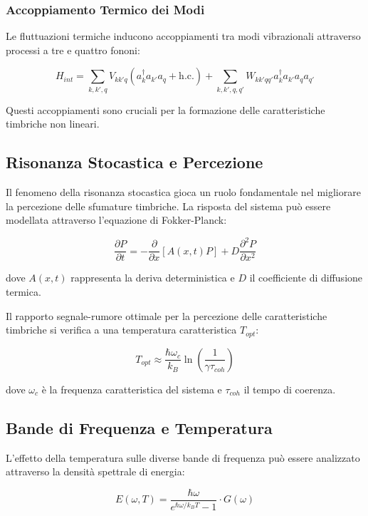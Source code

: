 \documentclass[a4paper,11pt]{article}
\begin{document}
\subsubsection{Accoppiamento Termico dei
Modi}\label{accoppiamento-termico-dei-modi}

Le fluttuazioni termiche inducono accoppiamenti tra modi vibrazionali
attraverso processi a tre e quattro fononi:

\[H_{int} = \sum_{k,k',q} V_{kk'q}(a_k^\dagger a_{k'} a_q + \text{h.c.}) +
    \sum_{k,k',q,q'} W_{kk'qq'}a_k^\dagger a_{k'} a_q a_{q'}\]

Questi accoppiamenti sono cruciali per la formazione delle
caratteristiche timbriche non lineari.

\subsection{Risonanza Stocastica e
Percezione}\label{risonanza-stocastica-e-percezione}

Il fenomeno della risonanza stocastica gioca un ruolo fondamentale nel
migliorare la percezione delle sfumature timbriche. La risposta del
sistema può essere modellata attraverso l'equazione di Fokker-Planck:

\[\frac{\partial P}{\partial t} = -\frac{\partial}{\partial x}[A(x,t)P] + D\frac{\partial^2 P}{\partial x^2}\]

dove \(A(x,t)\) rappresenta la deriva deterministica e \(D\) il
coefficiente di diffusione termica.

Il rapporto segnale-rumore ottimale per la percezione delle
caratteristiche timbriche si verifica a una temperatura caratteristica
\(T_{opt}\):

\[T_{opt} \approx \frac{\hbar\omega_c}{k_B}\ln\left(\frac{1}{\gamma\tau_{coh}}\right)\]

dove \(\omega_c\) è la frequenza caratteristica del sistema e
\(\tau_{coh}\) il tempo di coerenza.

\subsection{Bande di Frequenza e
Temperatura}\label{bande-di-frequenza-e-temperatura}

L'effetto della temperatura sulle diverse bande di frequenza può essere
analizzato attraverso la densità spettrale di energia:

\[E(\omega, T) = \frac{\hbar\omega}{e^{\hbar\omega/k_BT} - 1} \cdot G(\omega)\]
\end{document}
